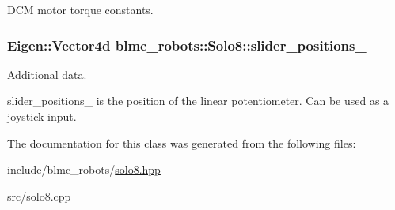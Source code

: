 D\+CM motor torque constants. 

\subsubsection[{\texorpdfstring{slider\+\_\+positions\+\_\+}{slider_positions_}}]{\setlength{\rightskip}{0pt plus 5cm}Eigen\+::\+Vector4d blmc\+\_\+robots\+::\+Solo8\+::slider\+\_\+positions\+\_\+\hspace{0.3cm}{\ttfamily [private]}}\hypertarget{classblmc__robots_1_1Solo8_af9d34a00b42e425515d1d7571c59ddca}{}\label{classblmc__robots_1_1Solo8_af9d34a00b42e425515d1d7571c59ddca}


Additional data. 

slider\+\_\+positions\+\_\+ is the position of the linear potentiometer. Can be used as a joystick input. 

The documentation for this class was generated from the following files\+:\begin{DoxyCompactItemize}
\item 
include/blmc\+\_\+robots/\hyperlink{solo8_8hpp}{solo8.\+hpp}\item 
src/solo8.\+cpp\end{DoxyCompactItemize}
